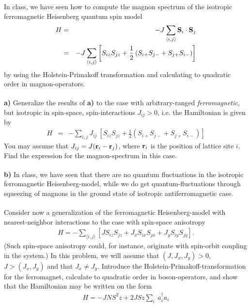 \begin{problem}
In class, we have seen how to compute the magnon spectrum of the isotropic ferromagnetic Heisenberg quantum spin model
\begin{eqnarray}
	H & = & - J \sum_{\langle i,j\rangle} {\bf S} _i \cdot {\bf S}_j \nonumber \\
	& = & -    J \sum_{\langle i,j\rangle} \left[S_{iz}  S_{jz} + \frac{1}{2}   \left(S_{i+} S_{j-} + S_{j+} S_{i-} \right)  \right] \nonumber
\end{eqnarray}  
by using the Holstein-Primakoff transformation and calculating to quadratic order in magnon-operators. 
\ \\
\ \\
{\bf a)} Generalize the results of {\bf a)} to the case with arbitrary-ranged {\it ferromagnetic}, but isotropic in spin-space, spin-interactions $J_{ij}>0$, i.e. the Hamiltonian is given by 
\begin{eqnarray}
	H  & = & -  \sum_{i,j} J_{ij} ~ \left[S_{iz}  S_{jz} + \frac{1}{2}   \left(S_{i+} S_{j-} + S_{j+} S_{i-} \right)  \right] \nonumber
\end{eqnarray}  
You may assume that $J_{ij}= J({\bf r}_i-{\bf r}_j)$, where ${\bf r}_i$ is the position of lattice site $i$. Find the expression for the magnon-spectrum in this case. 
\ \\
\ \\
{\bf b)} In class, we have seen that there are no quantum fluctuations in the isotropic ferromagnetic Heisenberg-model, while we do get quantum-fluctuations through squeezing of magnons in the ground state of isotropic antiferromagnetic case. 
\ \\
\ \\
Consider now a generalization of the ferromagnetic Heisenberg-model with nearest-neighbor interactions to the case with spin-space anisotropy
\begin{eqnarray}
	H = - \sum_{\langle i,j \rangle} \left[ J S_{iz} S_{jz} + J_x S_{ix} S_{jx} + J_y S_{iy} S_{jy} \right]. \nonumber
\end{eqnarray} 
(Such spin-space anisotropy could, for instance, originate with spin-orbit coupling in the system.) 
In this problem, we will assume that $(J,J_x,J_y) >0$, $J > (J_x,J_y) $ and that $J_x \neq J_y$. Introduce the Holstein-Primakoff-transformation for the ferromagnet, calculate to quadratic order in boson-operators, and show that the Hamiltonian may be written on the form
\begin{eqnarray}
	H = -J N S^2 z + 2 J S z \sum_i ~ a^{\dagger}_i a_i 

\end{eqnarray}
\end{problem}
